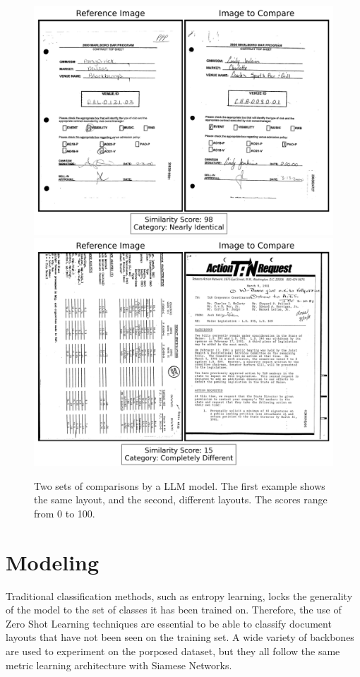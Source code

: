 \begin{figure}[htbp]
    \centering
    \includegraphics[width=.8\linewidth]{images/similar.png}
    \\[1em]
    \centering
    \includegraphics[width=.8\linewidth]{images/different.png}
    \caption{Two sets of comparisons by a LLM model. The first example shows the same layout, and the second, different layouts. The scores range from 0 to 100.}
    \label{fig:document_comparison}
\end{figure}

\section{Modeling}
\label{sec:method_modeling}

Traditional classification methods, such as entropy learning, locks the generality of the model to the set of classes it has been trained on. Therefore, the use of Zero Shot Learning techniques are essential to be able to classify document layouts that have not been seen on the training set. A wide variety of backbones are used to experiment on the porposed dataset, but they all follow the same metric learning architecture with Siamese Networks.

